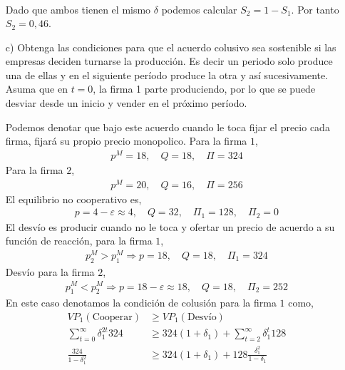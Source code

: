 \begin{itemize}
\begin{solution}
\begin{align*}
        \end{align*}
        Dado que ambos tienen el mismo $\delta$ podemos calcular $S_2 = 1-S_1$. Por tanto $S_2 = 0,46$.
    \end{solution}
    \item[c)] Obtenga las condiciones para que el acuerdo colusivo sea sostenible si las empresas deciden turnarse la producción. Es decir un periodo solo produce una de ellas y en el siguiente período produce la otra y así sucesivamente. Asuma que en $t=0$, la firma 1 parte produciendo, por lo que se puede desviar desde un inicio y vender en el próximo período.
    \begin{solution}
        Podemos denotar que bajo este acuerdo cuando le toca fijar el precio cada firma, fijará su propio precio monopolico. Para la firma $1$,
        \begin{align*}
            p^{M}=18,\quad Q=18,\quad \Pi=324
        \end{align*}
        Para la firma $2$,
        \begin{align*}
            p^{M}=20, \quad Q=16, \quad \Pi=256
        \end{align*}
        El equilibrio no cooperativo es,
        \begin{align*}
            p=4-\varepsilon \approx 4, \quad Q=32, \quad \Pi_{1}=128, \quad \Pi_2=0
        \end{align*}
        El desvío es producir cuando no le toca y ofertar un precio de acuerdo a su función de reacción, para la firma $1$,
        \begin{align*}
            p_{2}^{M}>p_{1}^{M} \Longrightarrow p=18, \quad Q=18, \quad \Pi_1 =324
        \end{align*}
        Desvío para la firma $2$,
        \begin{align*}
            p_{1}^{M}<p_{2}^{M} \Longrightarrow p=18-\varepsilon \approx 18, \quad Q=18, \quad \Pi_2 = 252
        \end{align*}
        En este caso denotamos la condición de colusión para la firma $1$ como,
        \begin{align*}
            VP_{1}(\text {Cooperar}) & \geq V P_{1}(\text {Desvío}) \\
            \sum_{t=0}^{\infty} \delta_{1}^{2 t} 324 & \geq 324\left(1+\delta_{1}\right)+\sum_{t=2}^{\infty} \delta_{1}^{t} 128 \\
            \frac{324}{1-\delta_{1}^{2}} & \geq 324(1+\delta_{1})+128 \frac{\delta_{1}^{2}}{1-\delta_{1}} \\

\end{align*}
\end{solution}
\end{itemize}
